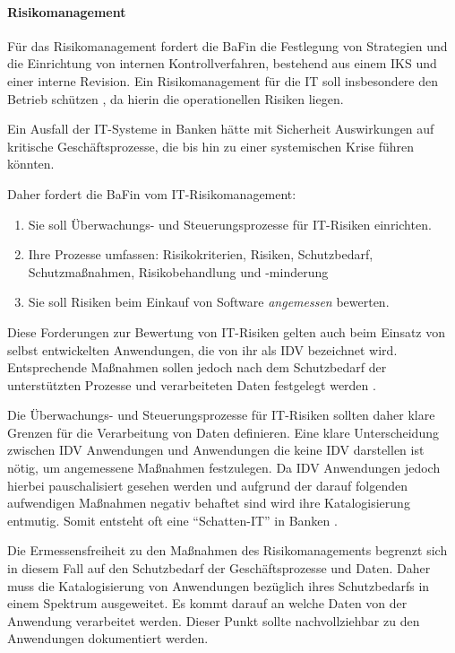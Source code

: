 \paragraph{Risikomanagement}
Für das Risikomanagement fordert die \ac{BaFin} die Festlegung von Strategien und die Einrichtung von internen Kontrollverfahren, bestehend aus einem \ac{IKS} und einer interne Revision. Ein Risikomanagement für die IT soll insbesondere den Betrieb schützen \cite{MaRisk:2017}, da hierin die operationellen Risiken liegen. 

Ein Ausfall der IT-Systeme in Banken hätte mit Sicherheit Auswirkungen auf kritische Geschäftsprozesse, die bis hin zu einer systemischen Krise führen könnten.

Daher fordert die \ac{BaFin} \cite{MaRisk:2017} vom IT-Risikomanagement:
\begin{enumerate}
    \item Sie soll Überwachungs- und Steuerungsprozesse für IT-Risiken einrichten.
    \item Ihre Prozesse umfassen: Risikokriterien, Risiken, Schutzbedarf, Schutzmaßnahmen, Risikobehandlung und -minderung
    \item Sie soll Risiken beim Einkauf von Software \emph{angemessen} bewerten.
\end{enumerate}
Diese Forderungen \cite{MaRisk:2017} zur Bewertung von IT-Risiken gelten auch beim Einsatz von selbst entwickelten Anwendungen, die von ihr als \ac{IDV} bezeichnet wird. Entsprechende Maßnahmen sollen jedoch nach dem Schutzbedarf der unterstützten Prozesse und verarbeiteten Daten festgelegt werden \cite{MaRisk:2017}.

Die Überwachungs- und Steuerungsprozesse für IT-Risiken sollten daher klare Grenzen für die Verarbeitung von Daten definieren. Eine klare Unterscheidung zwischen \ac{IDV} Anwendungen und Anwendungen die keine \ac{IDV} darstellen ist nötig, um angemessene Maßnahmen festzulegen. Da \ac{IDV} Anwendungen jedoch hierbei pauschalisiert gesehen werden und aufgrund der darauf folgenden aufwendigen Maßnahmen negativ behaftet sind wird ihre Katalogisierung entmutig. Somit entsteht oft eine \enquote{Schatten-IT} in Banken \cite{Dorschel2018}.

Die Ermessensfreiheit zu den Maßnahmen des Risikomanagements begrenzt sich in diesem Fall auf den Schutzbedarf der Geschäftsprozesse und Daten. Daher muss die Katalogisierung von Anwendungen bezüglich ihres Schutzbedarfs in einem Spektrum ausgeweitet. Es kommt darauf an welche Daten von der Anwendung verarbeitet werden. Dieser Punkt sollte nachvollziehbar zu den Anwendungen dokumentiert werden.


